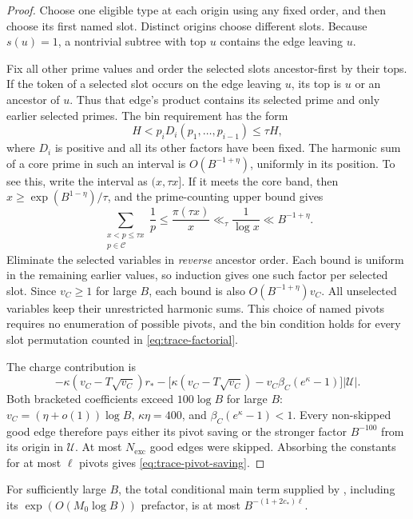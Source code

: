 \begin{proof}
Choose one eligible type at each origin using any fixed order, and
then choose its first named slot.  Distinct origins choose different
slots.  Because $s(u)=1$, a nontrivial subtree with top $u$ contains
the edge leaving $u$.

Fix all other prime values and order the selected slots ancestor-first
by their tops.  If the token of a selected slot occurs on the edge
leaving $u$, its top is $u$ or an ancestor of $u$.  Thus that edge's
product contains its selected prime and only earlier selected primes.
The bin requirement has the form
\[
 H<p_i D_i(p_1,\ldots,p_{i-1})\le\tau H,
\]
where $D_i$ is positive and all its other factors have been fixed.
The harmonic sum of a core prime in such an interval is
$O(B^{-1+\eta})$, uniformly in its position.  To see this, write the
interval as $(x,\tau x]$.  If it meets the core band, then
$x\ge \exp(B^{1-\eta})/\tau$, and the prime-counting upper bound gives
\[
 \sum_{\substack{x<p\le\tau x\\p\in\mathcal C}}\frac1p
 \le\frac{\pi(\tau x)}x
 \ll_\tau\frac1{\log x}\ll B^{-1+\eta}.
\]
Eliminate the selected variables in \emph{reverse} ancestor order.
Each bound is uniform in the remaining earlier values, so induction
gives one such factor per selected slot.  Since $v_C\ge1$ for large
$B$, each bound is also $O(B^{-1+\eta})v_C$.  All unselected variables
keep their unrestricted harmonic sums.  This choice of named pivots
requires no enumeration of possible pivots, and the bin condition
holds for every slot permutation counted in \eqref{eq:trace-factorial}.

The charge contribution is
\[
 -\kappa(v_C-T\sqrt{v_C})r_*
 -\bigl[\kappa(v_C-T\sqrt{v_C})
           -v_C\beta_C(e^\kappa-1)\bigr]|\mathcal U|.
\]
Both bracketed coefficients exceed $100\log B$ for large $B$:
$v_C=(\eta+o(1))\log B$, $\kappa\eta=400$, and
$\beta_C(e^\kappa-1)<1$.  Every non-skipped good edge therefore pays
either its pivot saving or the stronger factor $B^{-100}$ from its
origin in $\mathcal U$.  At most $N_{\mathrm{exc}}$ good edges were
skipped.  Absorbing the constants for at most $\ell$ pivots gives
\eqref{eq:trace-pivot-saving}.
\end{proof}

\begin{lemma}\label{lem:trace-summation}
For sufficiently large $B$, the total conditional main term supplied
by , including its
$\exp(O(M_0\log B))$ prefactor, is at most
$B^{-(1+2c_*)\ell}$.
\end{lemma}

